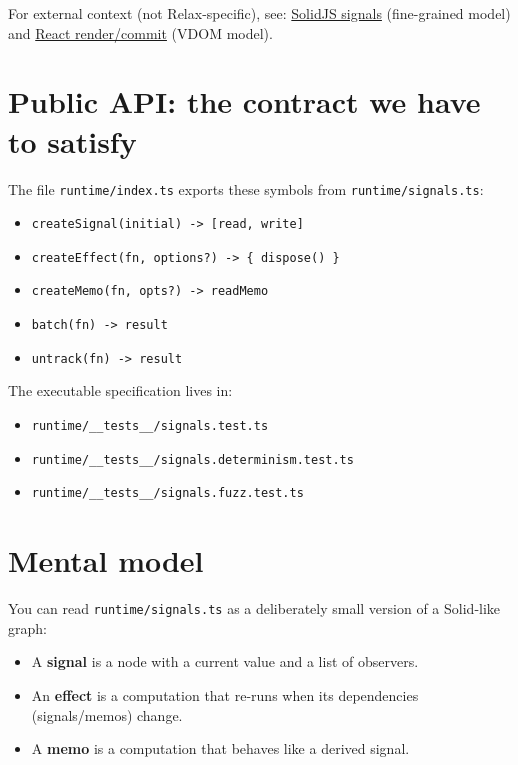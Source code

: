 For external context (not Relax-specific), see:
\href{https://www.solidjs.com/docs/latest#signals}{SolidJS signals} (fine-grained model) and
\href{https://react.dev/learn/render-and-commit}{React render/commit} (VDOM model).

\section{Public API: the contract we have to satisfy}

The file \texttt{runtime/index.ts} exports these symbols from \texttt{runtime/signals.ts}:

\begin{itemize}
  \item \texttt{createSignal(initial) -> [read, write]}
  \item \texttt{createEffect(fn, options?) -> \{ dispose() \}}
  \item \texttt{createMemo(fn, opts?) -> readMemo}
  \item \texttt{batch(fn) -> result}
  \item \texttt{untrack(fn) -> result}
\end{itemize}

The executable specification lives in:

\begin{itemize}
  \item \texttt{runtime/\_\_tests\_\_/signals.test.ts}
  \item \texttt{runtime/\_\_tests\_\_/signals.determinism.test.ts}
  \item \texttt{runtime/\_\_tests\_\_/signals.fuzz.test.ts}
\end{itemize}

\section{Mental model}

You can read \texttt{runtime/signals.ts} as a deliberately small version of a Solid-like graph:

\begin{itemize}
  \item A \textbf{signal} is a node with a current value and a list of observers.
  \item An \textbf{effect} is a computation that re-runs when its dependencies (signals/memos) change.
  \item A \textbf{memo} is a computation that behaves like a derived signal.
\end{itemize}

